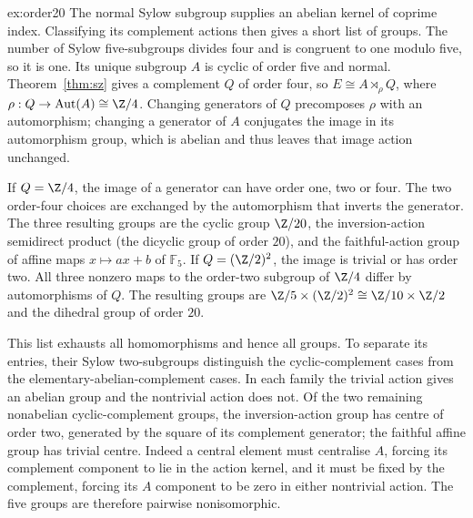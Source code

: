 \begin{solution}{ex:order20}
\idea The normal Sylow subgroup supplies an abelian kernel of coprime index. Classifying its complement actions then gives a short list of groups.
\writeup The number of Sylow five-subgroups divides four and is congruent to one modulo five, so it is one. Its unique subgroup $A$ is cyclic of order five and normal. Theorem~\ref{thm:sz} gives a complement $Q$ of order four, so
$E\cong A\rtimes_\rho Q$, where
$\rho:Q\to\operatorname{Aut}(A)\cong\Z/4$.
Changing generators of $Q$ precomposes $\rho$ with an automorphism; changing a generator of $A$ conjugates the image in its automorphism group, which is abelian and thus leaves that image action unchanged.

If $Q=\Z/4$, the image of a generator can have order one, two or four. The two order-four choices are exchanged by the automorphism that inverts the generator. The three resulting groups are the cyclic group $\Z/20$, the inversion-action semidirect product (the dicyclic group of order $20$), and the faithful-action group of affine maps $x\mapsto ax+b$ of $\mathbb F_5$.
If $Q=(\Z/2)^2$, the image is trivial or has order two. All three nonzero maps to the order-two subgroup of $\Z/4$ differ by automorphisms of $Q$. The resulting groups are
$\Z/5\times(\Z/2)^2\cong\Z/10\times\Z/2$ and the dihedral group of order $20$.

This list exhausts all homomorphisms and hence all groups. To separate its entries, their Sylow two-subgroups distinguish the cyclic-complement cases from the elementary-abelian-complement cases. In each family the trivial action gives an abelian group and the nontrivial action does not. Of the two remaining nonabelian cyclic-complement groups, the inversion-action group has centre of order two, generated by the square of its complement generator; the faithful affine group has trivial centre. Indeed a central element must centralise $A$, forcing its complement component to lie in the action kernel, and it must be fixed by the complement, forcing its $A$ component to be zero in either nontrivial action. The five groups are therefore pairwise nonisomorphic.
\end{solution}

